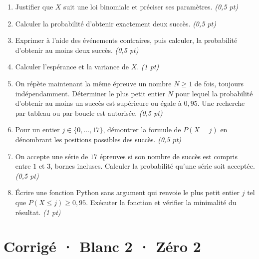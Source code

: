 \begin{enumerate}

\item Justifier que $X$ suit une loi binomiale et préciser ses paramètres. \hfill\textit{(0,5 pt)}

\item Calculer la probabilité d'obtenir exactement deux succès. \hfill\textit{(0,5 pt)}

\item Exprimer à l'aide des événements contraires, puis calculer, la probabilité d'obtenir au moins deux succès. \hfill\textit{(0,5 pt)}

\item Calculer l'espérance et la variance de $X$. \hfill\textit{(1 pt)}

\item On répète maintenant la même épreuve un nombre $N\ge1$ de fois, toujours indépendamment. Déterminer le plus petit entier $N$ pour lequel la probabilité d'obtenir au moins un succès est supérieure ou égale à $0{,}95$. Une recherche par tableau ou par boucle est autorisée. \hfill\textit{(0,5 pt)}

\item Pour un entier $j\in\{0,\ldots,17\}$, démontrer la formule de $P(X=j)$ en dénombrant les positions possibles des succès. \hfill\textit{(0,5 pt)}

\item On accepte une série de $17$ épreuves si son nombre de succès est compris entre $1$ et $3$, bornes incluses. Calculer la probabilité qu'une série soit acceptée. \hfill\textit{(0,5 pt)}

\item Écrire une fonction Python sans argument qui renvoie le plus petit entier $j$ tel que $P(X\le j)\ge0{,}95$. Exécuter la fonction et vérifier la minimalité du résultat. \hfill\textit{(1 pt)}

\end{enumerate}

\ifprof\clearpage

\section*{Corrigé · Blanc 2 · Zéro 2}\label{cor:8-2}

